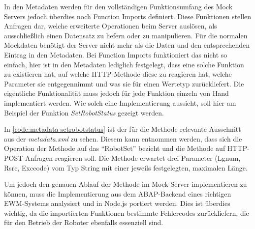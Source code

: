 In den Metadaten werden für den vollständigen Funktionsumfang des Mock Servers jedoch überdies noch Function Imports definiert.
Diese Funktionen stellen Anfragen dar, welche erweiterte Operationen beim Server auslösen, als ausschließlich einen Datensatz zu liefern oder zu manipulieren.
Für die normalen Mockdaten benötigt der Server nicht mehr als die Daten und den entsprechenden Eintrag in den Metadaten.
Bei Function Imports funktioniert das nicht so einfach, hier ist in den Metadaten lediglich festgelegt, dass eine solche Funktion zu existieren hat, auf welche \ac{HTTP}-Methode diese zu reagieren hat, welche Parameter sie entgegennimmt und was sie für einen Wertetyp zurückliefert.
Die eigentliche Funktionalität muss jedoch für jede Funktion einzeln von Hand implementiert werden.
Wie solch eine Implementierung aussieht, soll hier am Beispiel der Funktion \emph{SetRobotStatus} gezeigt werden.



In \autoref{code:metadata-setrobotstatus} ist der für die Methode relevante Ausschnitt aus der \emph{metadata.xml} zu sehen.
Diesem kann entnommen werden, dass sich die Operation der Methode auf das \enquote{RobotSet} bezieht und die Methode auf \ac{HTTP}-POST-Anfragen reagieren soll.
Die Methode erwartet drei Parameter (Lgnum, Rsrc, Exccode) vom Typ String mit einer jeweils festgelegten, maximalen Länge.

Um jedoch den genauen Ablauf der Methode im Mock Server implementieren zu können, muss die Implementierung aus dem ABAP-Backend eines richtigen \ac{EWM}-Systems analysiert und in Node.js portiert werden.
Dies ist überdies wichtig, da die importierten Funktionen bestimmte Fehlercodes zurückliefern, die für den Betrieb der Roboter ebenfalls essenziell sind.

